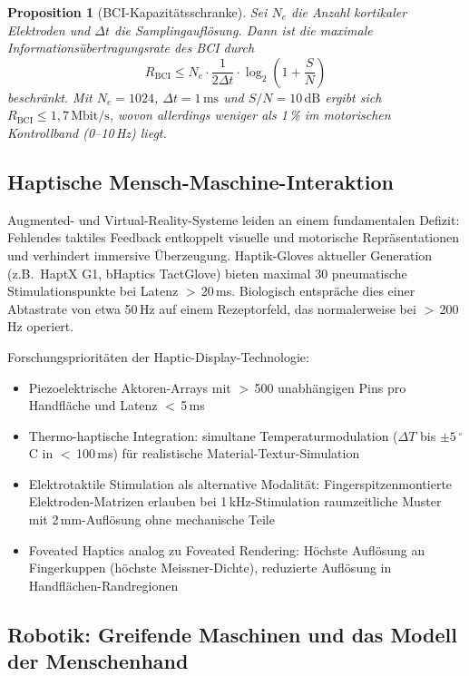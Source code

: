 ﻿\documentclass[12pt,a4paper]{report}
\theoremstyle{plain}
\newtheorem{proposition}[theorem]{Proposition}
\theoremstyle{definition}
\theoremstyle{remark}
\begin{document}
\begin{proposition}[BCI-Kapazitätsschranke]
Sei $N_e$ die Anzahl kortikaler Elektroden und $\Delta t$ die
Samplingauflösung. Dann ist die maximale Informationsübertragungsrate
des BCI durch
\begin{equation}
  R_{\mathrm{BCI}} \leq N_e \cdot \frac{1}{2\Delta t}
  \cdot \log_2\!\left(1 + \frac{S}{N}\right)
\end{equation}
beschränkt. Mit $N_e = 1024$, $\Delta t = 1\,\mathrm{ms}$ und
$S/N = 10\,\mathrm{dB}$ ergibt sich $R_{\mathrm{BCI}} \leq 1{,}7\,\mathrm{Mbit/s}$,
wovon allerdings weniger als 1\,\% im motorischen Kontrollband
(0--10\,Hz) liegt.
\end{proposition}

\subsection{Haptische Mensch-Maschine-Interaktion}

Augmented- und Virtual-Reality-Systeme leiden an einem fundamentalen
Defizit: Fehlendes taktiles Feedback entkoppelt visuelle und motorische
Repräsentationen und verhindert immersive Überzeugung. Haptik-Gloves
aktueller Generation (z.B.\ HaptX G1, bHaptics TactGlove) bieten
maximal 30 pneumatische Stimulationspunkte bei Latenz $>$\,20\,ms.
Biologisch entspräche dies einer Abtastrate von etwa 50\,Hz auf einem
Rezeptorfeld, das normalerweise bei $>$\,200\,Hz operiert.

Forschungsprioritäten der Haptic-Display-Technologie:
\begin{itemize}
\item Piezoelektrische Aktoren-Arrays mit $>$\,500 unabhängigen Pins
  pro Handfläche und Latenz $<$\,5\,ms
\item Thermo-haptische Integration: simultane Temperaturmodulation
  ($\Delta T$ bis $\pm 5\,^{\circ}$C in $<$\,100\,ms) für realistische
  Material-Textur-Simulation
\item Elektrotaktile Stimulation als alternative Modalität:
  Fingerspitzenmontierte Elektro\-den-Matrizen erlauben bei 1\,kHz-Stimulation
  raumzeitliche Muster mit 2\,mm-Auflösung ohne mechanische Teile
\item Foveated Haptics analog zu Foveated Rendering: Höchste Auflösung
  an Fingerkuppen (höchste Meissner-Dichte), reduzierte Auflösung in
  Handflächen-Randregionen
\end{itemize}

\subsection{Robotik: Greifende Maschinen und das Modell der Menschenhand}
\end{document}
